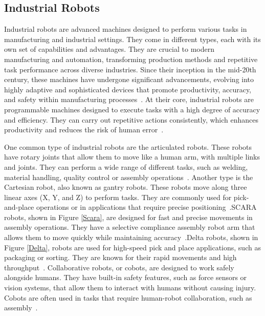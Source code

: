 

\subsection{Industrial Robots}\label{IR}
Industrial robots are advanced machines designed to perform various tasks in manufacturing and industrial settings. They come in different types, each with its own set of capabilities and advantages. They are crucial to modern manufacturing and automation, transforming production methods and repetitive task performance across diverse industries. Since their inception in the mid-20th century, these machines have undergone significant advancements, evolving into highly adaptive and sophisticated devices that promote productivity, accuracy, and safety within manufacturing processes~\cite{Ji.2019}.
At their core, industrial robots are programmable machines designed to execute tasks with a high degree of accuracy and efficiency. They can carry out repetitive actions consistently, which enhances productivity and reduces the risk of human error~\cite{Siciliano.2016}. 



One common type of industrial robots are the articulated robots. These robots have rotary joints that allow them to move like a human arm, with multiple links and joints. They can perform a wide range of different tasks, such as welding, material handling, quality control or assembly operations~\cite{Hanafusa.1981, Jain.2019}. Another type is the Cartesian robot, also known as gantry robots. These robots move along three linear axes (X, Y, and Z) to perform tasks. They are commonly used for pick-and-place operations or in applications that require precise positioning~\cite{Kim.2003}.\newline SCARA robots, shown in Figure \ref{Scara}, are designed for fast and precise movements in assembly operations. They have a selective compliance assembly robot arm that allows them to move quickly while maintaining accuracy~\cite{Das.2005}.\newline Delta robots, shown in Figure \ref{Delta}, robots are used for high-speed pick and place applications, such as packaging or sorting. They are known for their rapid movements and high throughput~\cite{bonev2001delta}. Collaborative robots, or cobots, are designed to work safely alongside humans. They have built-in safety features, such as force sensors or vision systems, that allow them to interact with humans without causing injury. Cobots are often used in tasks that require human-robot collaboration, such as assembly~\cite{Liu.2022b}.



